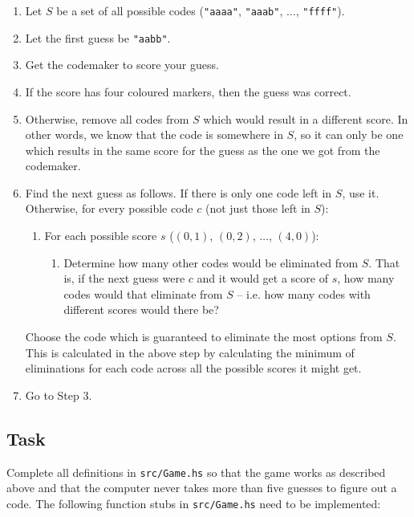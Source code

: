 \documentclass{cs256-shared/cs256}
\begin{document}
\begin{enumerate}
    \item Let $S$ be a set of all possible codes (\texttt{"aaaa"}, \texttt{"aaab"}, $\ldots$, \texttt{"ffff"}).
    \item Let the first guess be \texttt{"aabb"}.
    \item Get the codemaker to score your guess.
    \item If the score has four coloured markers, then the guess was correct.
    \item Otherwise, remove all codes from $S$ which would result in a different score. In other words, we know that the code is somewhere in $S$, so it can only be one which results in the same score for the guess as the one we got from the codemaker. 
    \item Find the next guess as follows. If there is only one code left in $S$, use it. Otherwise, for every possible code $c$ (not just those left in $S$):
    \begin{enumerate}
        \item For each possible score $s$ ($(0,1)$, $(0,2)$, $\ldots$, $(4,0)$):
        \begin{enumerate}
            \item Determine how many other codes would be eliminated from $S$. That is, if the next guess were $c$ and it would get a score of $s$, how many codes would that eliminate from $S$ -- i.e. how many codes with different scores would there be?
        \end{enumerate}
    \end{enumerate}
    Choose the code which is guaranteed to eliminate the most options from $S$. This is calculated in the above step by calculating the minimum of eliminations for each code across all the possible scores it might get.
    \item Go to Step 3.
\end{enumerate}


\subsection*{Task}

Complete all definitions in \texttt{src/Game.hs} so that the game works as described above and that the computer never takes more than five guesses to figure out a code. The following function stubs in \texttt{src/Game.hs}  need to be implemented:
\end{document}
